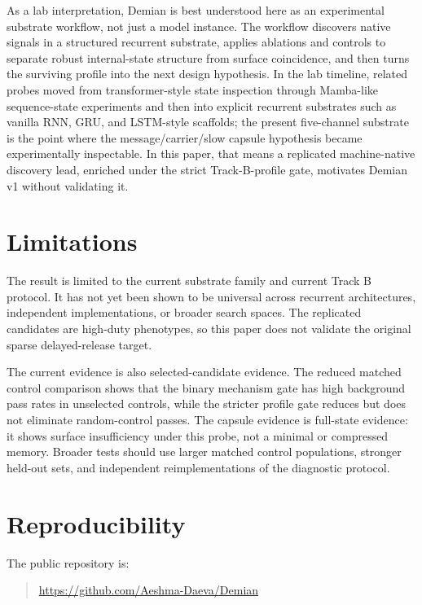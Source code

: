 \documentclass[11pt]{article}
\begin{document}
As a lab interpretation, Demian is best understood here as an experimental
substrate workflow, not just a model instance. The workflow discovers native
signals in a structured recurrent substrate, applies ablations and controls to
separate robust internal-state structure from surface coincidence, and then
turns the surviving profile into the next design hypothesis. In the lab
timeline, related probes moved from transformer-style state inspection through
Mamba-like sequence-state experiments and then into explicit recurrent
substrates such as vanilla RNN, GRU, and LSTM-style scaffolds; the present
five-channel substrate is the point where the message/carrier/slow capsule
hypothesis became experimentally inspectable. In this paper, that means a
replicated machine-native discovery lead, enriched under the strict
Track-B-profile gate, motivates Demian v1 without validating it.

\section{Limitations}

The result is limited to the current substrate family and current Track B
protocol. It has not yet been shown to be universal across recurrent
architectures, independent implementations, or broader search spaces. The
replicated candidates are high-duty phenotypes, so this paper does not validate
the original sparse delayed-release target.

The current evidence is also selected-candidate evidence. The reduced matched
control comparison shows that the binary mechanism gate has high background
pass rates in unselected controls, while the stricter profile gate reduces but
does not eliminate random-control passes. The capsule evidence is full-state
evidence: it shows surface insufficiency under this probe, not a minimal or
compressed memory. Broader tests should use larger matched control
populations, stronger held-out sets, and independent reimplementations of the
diagnostic protocol.

\section{Reproducibility}

The public repository is:

\begin{quote}
\url{https://github.com/Aeshma-Daeva/Demian}
\end{quote}
\end{document}
